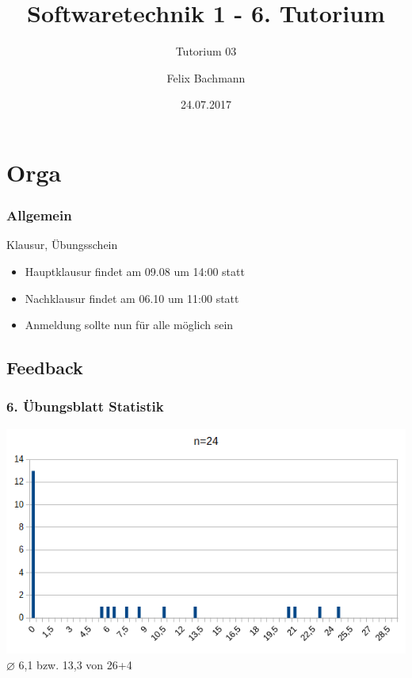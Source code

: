 \documentclass[18pt]{beamer}
\title[SWT1]{Softwaretechnik 1 - 6. Tutorium}
\subtitle{Tutorium 03}
\author{Felix Bachmann}
\date{24.07.2017}
\institute{KIT - Institut für Programmstrukturen und Datenorganisation (IPD)}
\begin{document}
	
\setcounter{tocdepth}{2}
	
\begin{frame}
\titlepage
\end{frame}

\begin{frame}
\tableofcontents
\end{frame}


\section{Orga}
	\begin{frame}
		\frametitle{Allgemein}
		\begin{block}{Klausur, Übungsschein}
			\begin{itemize}
				\item Hauptklausur findet am 09.08 um 14:00 statt
				\item Nachklausur findet am 06.10 um 11:00 statt
				\item Anmeldung sollte nun für alle möglich sein
			\end{itemize}
		\end{block}
	\end{frame}

	\subsection{Feedback}
	\begin{frame}
		\frametitle{6. Übungsblatt Statistik}
		\includegraphics[scale=0.7]{./pics/tut6/statistics-ub6.png}
		\linebreak \centering $\diameter$ 6,1 bzw. 13,3 von 26+4
	\end{frame}
\end{document}
